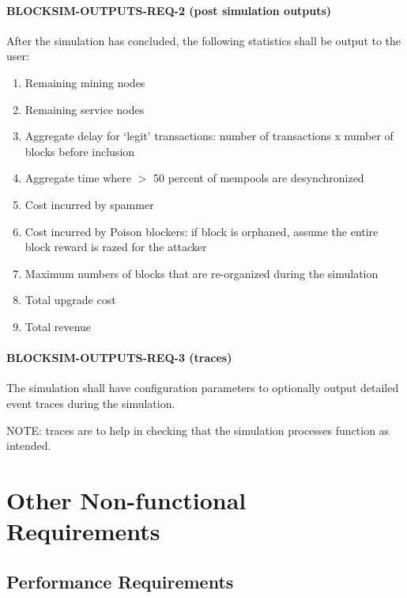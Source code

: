 \documentclass{scrreprt}
\begin{document}
      \subsubsection{BLOCKSIM-OUTPUTS-REQ-2 (post simulation outputs)}

        After the simulation has concluded, the following statistics shall be
        output to the user:

        \begin{enumerate}
          \item Remaining mining nodes
          \item Remaining service nodes
          \item Aggregate delay for `legit' transactions: number of
            transactions x
            number of blocks before inclusion
          \item Aggregate time where $>$ 50 percent of mempools are
            desynchronized
          \item Cost incurred by spammer
          \item Cost incurred by Poison blockers: if block is orphaned, assume
            the entire block reward is razed for the attacker
          \item Maximum numbers of blocks that are re-organized during the
            simulation
          \item Total upgrade cost
          \item Total revenue
        \end{enumerate}

      \subsubsection{BLOCKSIM-OUTPUTS-REQ-3 (traces)}

        The simulation shall have configuration parameters to optionally
        output detailed event traces during the simulation.

        NOTE: traces are to help in checking that the simulation processes
        function as intended.

\chapter{Other Non-functional Requirements}

  \section{Performance Requirements}
\end{document}

